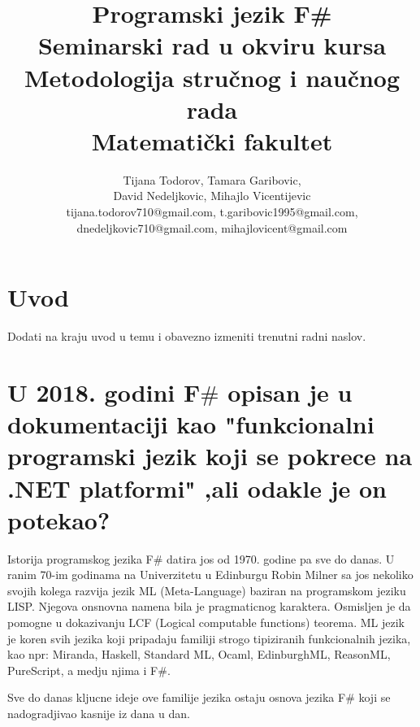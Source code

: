 \documentclass[a4paper]{article}
\begin{document}
\title{Programski jezik F\#\\ \small{Seminarski rad u okviru kursa\\Metodologija stručnog i naučnog rada\\ Matematički fakultet}}

\author{Tijana Todorov, Tamara Garibovic,\\ David Nedeljkovic, Mihajlo Vicentijevic \\ tijana.todorov710@gmail.com, t.garibovic1995@gmail.com, \\ dnedeljkovic710@gmail.com, mihajlovicent@gmail.com}


\maketitle


\tableofcontents

\newpage

\section{Uvod}
\label{sec:uvod}

Dodati na kraju uvod u temu i obavezno izmeniti trenutni radni naslov.

\section{U 2018. godini F$\#$ opisan je u dokumentaciji kao "funkcionalni programski jezik koji se pokrece na .NET platformi" \cite{early_history},ali odakle je on potekao?}
\label{sec:poreklo}

Istorija programskog jezika F$\#$ datira jos od 1970. godine pa sve do danas. U ranim 70-im godinama na Univerzitetu u Edinburgu Robin Milner sa jos nekoliko svojih kolega razvija jezik ML (Meta-Language) baziran na programskom jeziku LISP. Njegova onsnovna namena bila je pragmaticnog karaktera. Osmisljen je da pomogne u dokazivanju LCF (Logical computable functions) \cite{Milner:1972:LCF:891954} teorema. ML jezik je koren svih jezika koji pripadaju familiji strogo tipiziranih funkcionalnih jezika, kao npr: Miranda, Haskell, Standard ML, Ocaml, EdinburghML, ReasonML, PureScript, a medju njima i F$\#$.

Sve do danas kljucne ideje ove familije jezika ostaju osnova jezika F$\#$ koji se nadogradjivao kasnije iz dana u dan. 
\end{document}
